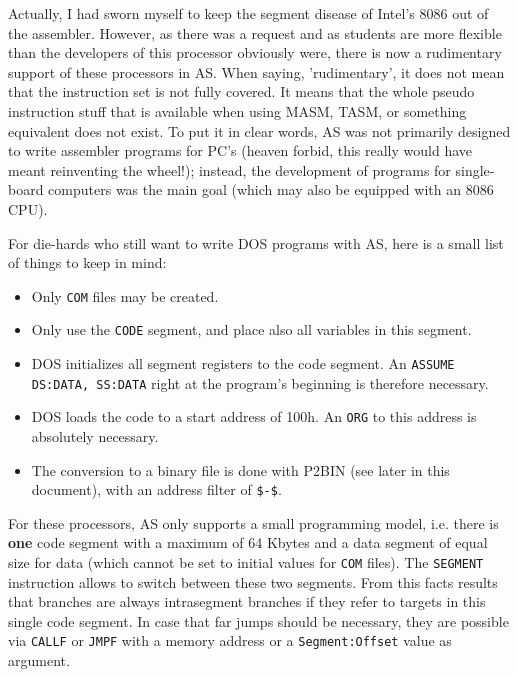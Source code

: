 \documentclass[12pt,twoside]{report}
\newcommand{\bb}[1]{{\bf #1}}
\newcommand{\tty}[1]{{\tt #1}}
\begin{document}
Actually, I had sworn myself to keep the segment disease of Intel's
8086 out of the assembler.  However, as there was a request and as
students are more flexible than the developers of this processor
obviously were, there is now a rudimentary support of these
processors in AS.  When saying, 'rudimentary', it does not mean that
the instruction set is not fully covered.  It means that the whole
pseudo instruction stuff that is available when using MASM, TASM, or
something equivalent does not exist.  To put it in clear words, AS
was not primarily designed to write assembler programs for PC's
(heaven forbid, this really would have meant reinventing the wheel!);
instead, the development of programs for single-board computers was
the main goal (which may also be equipped with an 8086 CPU).

For die-hards who still want to write DOS programs with AS, here is a
small list of things to keep in mind:
\begin{itemize}
\item{Only \tty{COM} files may be created.}
\item{Only use the \tty{CODE} segment, and place also all variables in
      this segment.}
\item{DOS initializes all segment registers to the code segment.
      An \tty{ASSUME DS:DATA, SS:DATA} right at the program's beginning
      is therefore necessary.}
\item{DOS loads the code to a start address of 100h.  An \tty{ORG} to this
      address is absolutely necessary.}
\item{The conversion to a binary file is done with P2BIN (see later in
      this document), with an address filter of \tty{\$-\$}.}
\end{itemize}
For these processors, AS only supports a small programming model, i.e.
there is \bb{one} code segment with a maximum of 64 Kbytes and a data
segment of equal size for data (which cannot be set to initial values for
\tty{COM} files).  The \tty{SEGMENT} instruction allows to switch between
these two segments.  From this facts results that branches are always
intrasegment branches if they refer to targets in this single code
segment.  In case that far jumps should be necessary, they are possible
via \tty{CALLF} or \tty{JMPF} with a memory address or a
\tty{Segment:Offset} value as argument.
\end{document}
